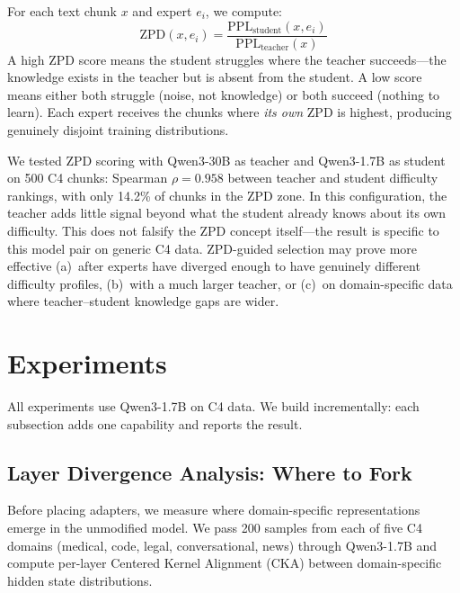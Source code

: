 \documentclass{article}
\begin{document}
For each text chunk $x$ and expert $e_i$, we compute:
\begin{equation}
\text{ZPD}(x, e_i) = \frac{\text{PPL}_{\text{student}}(x, e_i)}{\text{PPL}_{\text{teacher}}(x)}
\label{eq:zpd}
\end{equation}
A high ZPD score means the student struggles where the teacher succeeds---the
knowledge exists in the teacher but is absent from the student. A low score
means either both struggle (noise, not knowledge) or both succeed (nothing to
learn). Each expert receives the chunks where \emph{its own} ZPD is highest,
producing genuinely disjoint training distributions.

We tested ZPD scoring with Qwen3-30B as teacher and Qwen3-1.7B as student on
500 C4 chunks: Spearman $\rho = 0.958$ between teacher and student difficulty
rankings, with only 14.2\% of chunks in the ZPD zone. In this configuration,
the teacher adds little signal beyond what the student already knows about its
own difficulty. This does not falsify the ZPD concept itself---the result is
specific to this model pair on generic C4 data. ZPD-guided selection may prove
more effective (a)~after experts have diverged enough to have genuinely
different difficulty profiles, (b)~with a much larger teacher, or (c)~on
domain-specific data where teacher--student knowledge gaps are wider.

\section{Experiments}
\label{sec:experiments}

All experiments use Qwen3-1.7B on C4 data. We build incrementally: each
subsection adds one capability and reports the result.

\subsection{Layer Divergence Analysis: Where to Fork}
\label{sec:divergence}

Before placing adapters, we measure where domain-specific representations
emerge in the unmodified model. We pass 200 samples from each of five C4
domains (medical, code, legal, conversational, news) through Qwen3-1.7B and
compute per-layer Centered Kernel Alignment (CKA) between domain-specific
hidden state distributions.
\end{document}
